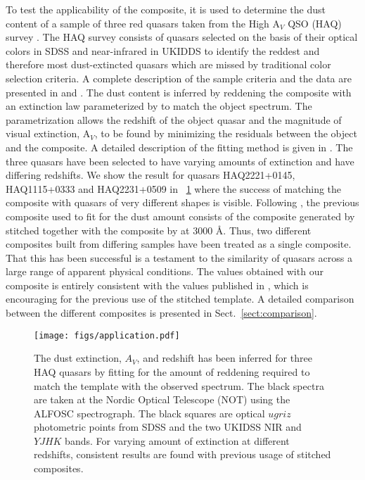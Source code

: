 \documentclass{aa}    %
\newcommand{\figref}[1]{\ref{fig:#1}}
\newcommand{\Fig}[1]{\figurename~\figref{#1}}
\newcommand{\fig}[1]{\Fig{#1}}
\newcommand{\figlabel}[1]{\label{fig:#1}}
\newcommand{\sectionname}{Sect.}
\newcommand{\Sect}[1]{\sectionname~\ref{sect:#1}}
\newcommand{\sect}[1]{\Sect{#1}}
\begin{document}
To test the applicability of the composite, it is used to determine the dust
content of a sample of three red quasars taken from the High A$_V$ QSO (HAQ)
survey \citep{Krogager2015}. The HAQ survey consists of quasars selected on the
basis of their optical colors in SDSS and near-infrared in UKIDDS to identify
the reddest and therefore most dust-extincted quasars which are missed by
traditional color selection criteria. A complete description of the sample
criteria and the data are presented in \citet{Fynbo2013} and
\citet{Krogager2015}. The dust content is inferred by reddening the composite
with an extinction law parameterized by \citet{Gordon2003} to match the object
spectrum. The parametrization allows the redshift of the object quasar and the
magnitude of visual extinction, A$_V$, to be found by minimizing the residuals
between the object and the composite. A detailed description of the fitting
method is given in \cite{Krogager2015}.
The three quasars have been selected to have varying amounts of extinction and
have differing redshifts. We show the result for quasars HAQ2221+0145,
HAQ1115+0333 and HAQ2231+0509 in \fig{application} where the success of matching
the composite with quasars of very different shapes is visible. 
Following \cite{Wang2012}, the previous composite used to fit for the dust
amount consists of the composite generated by \cite{VandenBerk2001} stitched
together with the composite by \cite{Glikman2006} at 3000 \AA. Thus, two
different composites built from differing samples have been treated as a single
composite. That this has been successful is a testament to the similarity of
quasars across a large range of apparent physical conditions. 
The values obtained with our composite is entirely consistent with the values
published in \cite{Krogager2015}, which is encouraging for the previous use of
the stitched template. A detailed comparison between the different composites is
presented in \sect{comparison}.

\begin{figure}[t!]
 \centering
 \texttt{[image: figs/application.pdf]}
 \caption[]{The dust extinction, $A_V$, and redshift has been inferred
   for three HAQ quasars by fitting for the amount of reddening
   required to match the template with the observed spectrum. The
   black spectra are taken at the Nordic Optical Telescope (NOT) using
   the ALFOSC spectrograph. The black squares are optical $ugriz$
   photometric points from SDSS and the two UKIDSS NIR and $YJHK$
   bands. For varying amount of extinction at different redshifts,
   consistent results are found with previous usage of stitched
   composites.}  \figlabel{application}
\end{figure}
 
\end{document}
